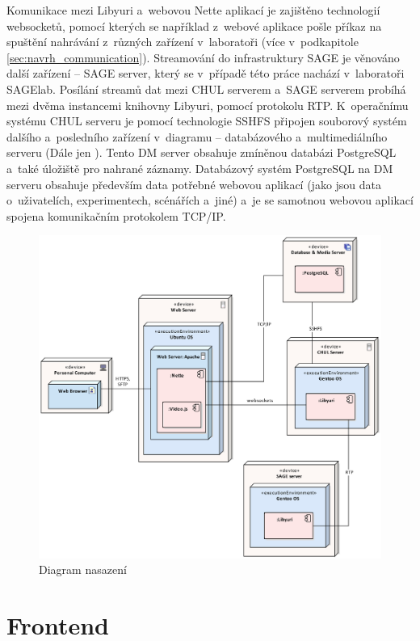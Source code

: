 \documentclass[thesis=M,czech]{FITthesis}[2012/06/26]
\begin{document}
\pagebreak 
Komunikace mezi Libyuri a~webovou Nette aplikací je zajištěno technologií websocketů, pomocí kterých se například z~webové aplikace pošle příkaz na spuštění nahrávání z~různých zařízení v~laboratoři (více v~podkapitole \ref{sec:navrh_communication}). Streamování do infrastruktury SAGE je věnováno další zařízení -- SAGE server, který se v~případě této práce nachází v~laboratoři SAGElab. Posílání streamů dat mezi CHUL serverem a~SAGE serverem probíhá mezi dvěma instancemi knihovny Libyuri, pomocí protokolu RTP. K~operačnímu systému CHUL serveru je pomocí technologie SSHFS připojen souborový systém dalšího a~posledního zařízení v~diagramu -- databázového a~multimediálního serveru (Dále jen ). Tento DM server obsahuje zmíněnou databázi PostgreSQL a~také úložiště pro nahrané záznamy. Databázový systém PostgreSQL na DM serveru obsahuje především data potřebné webovou aplikací (jako jsou data o~uživatelích, experimentech, scénářích a~jiné) a~je se samotnou webovou aplikací spojena komunikačním protokolem TCP/IP. 
\\
\begin{figure}[h]\centering
	\includegraphics[width=1\textwidth]{images/nasazeni_sage.eps}
	\caption{Diagram nasazení}\label{img:navrh_architektura_nasazeni}
\end{figure}


\section{Frontend} \label{sec:navrh_frontend}
\end{document}
